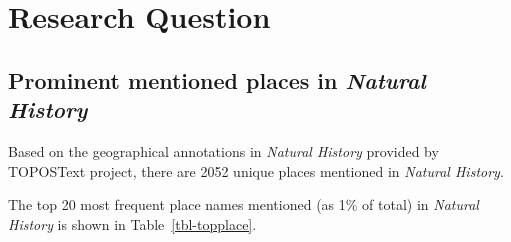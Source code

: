 \documentclass[
  12pt,
]{article}
\begin{document}
\hypertarget{sec-research_question}{%
\section{Research Question}\label{sec-research_question}}

\hypertarget{prominent-mentioned-places-in-natural-history}{%
\subsection{\texorpdfstring{Prominent mentioned places in \emph{Natural
History}}{Prominent mentioned places in Natural History}}\label{prominent-mentioned-places-in-natural-history}}

Based on the geographical annotations in \emph{Natural History} provided
by TOPOSText project, there are 2052 unique places mentioned in
\emph{Natural History}.

The top 20 most frequent place names mentioned (as 1\% of total) in
\emph{Natural History} is shown in Table~\ref{tbl-topplace}.
\end{document}
